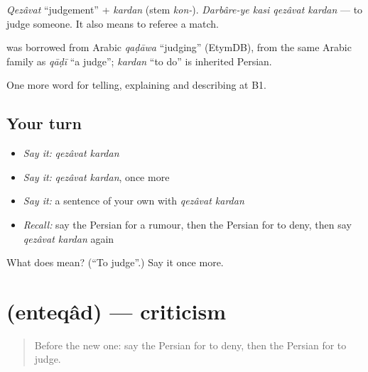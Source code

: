 \emph{Qezâvat} \textquotedblleft{}judgement\textquotedblright{} + \emph{kardan} (stem \emph{kon-}). \emph{Darbâre-ye kasi qezâvat kardan} — to judge someone. It also means to referee a match.

\begin{cousinweb}
\textbf{} was borrowed from Arabic \emph{qaḍāwa} \textquotedblleft{}judging\textquotedblright{} (EtymDB), from the same Arabic family as \emph{qāḍī} \textquotedblleft{}a judge\textquotedblright{}; \emph{kardan} \textquotedblleft{}to do\textquotedblright{} is inherited Persian.
\end{cousinweb}

\begin{grammarlens}[title={What you've built}]
One more word for telling, explaining and describing at B1.
\end{grammarlens}

\subsection*{Your turn}
\begin{itemize}
\raggedright
  \item \emph{Say it:} \emph{qezâvat kardan}
  \item \emph{Say it:} \emph{qezâvat kardan}, once more
  \item \emph{Say it:} a sentence of your own with \emph{qezâvat kardan}
  \item \emph{Recall:} say the Persian for a rumour, then the Persian for to deny, then say \emph{qezâvat kardan} again
\end{itemize}

\begin{tcolorbox}[breakable,colback=teal!4,colframe=teal!35!black,title={Before you move on}]
What does   mean? (\textquotedblleft{}To judge\textquotedblright{}.) Say it once more.
\end{tcolorbox}
\section[\texorpdfstring{\fa{انتقاد} (enteqâd)}{انتقاد (enteqâd)}]{ (enteqâd) — criticism}

\label{lesson:FA-C365-enteqad}



\begin{quote}
Before the new one: say the Persian for to deny, then the Persian for to judge.
\end{quote}

